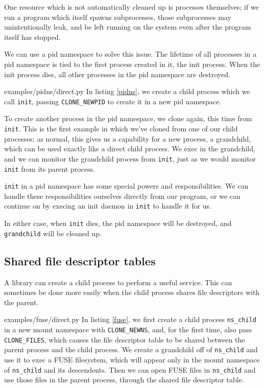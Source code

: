 \documentclass[letterpaper,twocolumn,10pt]{article}
\begin{document}
One resource which is not automatically cleaned up is processes themselves;
if we run a program which itself spawns subprocesses,
those subprocesses may unintentionally leak,
and be left running on the system even after the program itself has stopped.

We can use a pid namespace to solve this issue.
The lifetime of all processes in a pid namespace is tied to the first process created in it,
the init process.
When the init process dies,
all other processes in the pid namespace are destroyed.


{examples/pidns/direct.py}
In listing \ref{pidns},
we create a child process which we call \texttt{init},
passing \verb|CLONE_NEWPID| to create it in a new pid namespace.

To create another process in the pid namespace,
we clone again, this time from \texttt{init}.
This is the first example in which we've cloned from one of our child processes;
as normal, this gives us a capability for a new process, a grandchild,
which can be used exactly like a direct child process.
We exec in the grandchild,
and we can monitor the grandchild process from \texttt{init},
just as we would monitor \texttt{init} from its parent process.

\texttt{init} in a pid namespace has some special powers and responsibilities.
We can handle these responsibilities ourselves directly from our program,
or we can continue on by execing an init daemon in \texttt{init} to handle it for us.

In either case, when \texttt{init} dies,
the pid namespace will be destroyed,
and \texttt{grandchild} will be cleaned up.
\subsection{Shared file descriptor tables}\label{shared_fd_table}
A library can create a child process to perform a useful service.
This can sometimes be done more easily when the child process shares file descriptors with the parent.


{examples/fuse/direct.py}
In listing \ref{fuse},
we first create a child process \verb|ns_child| in a new mount namespace with \verb|CLONE_NEWNS|,
and, for the first time, also pass \verb|CLONE_FILES|,
which causes the file descriptor table to be shared between the parent process and the child process.
We create a grandchild off of \verb|ns_child|
and use it to exec a FUSE filesystem,
which will appear only in the mount namespace of \verb|ns_child| and its descendents.
Then we can open FUSE files in \verb|ns_child|
and use those files in the parent process,
through the shared file descriptor table.
\end{document}
